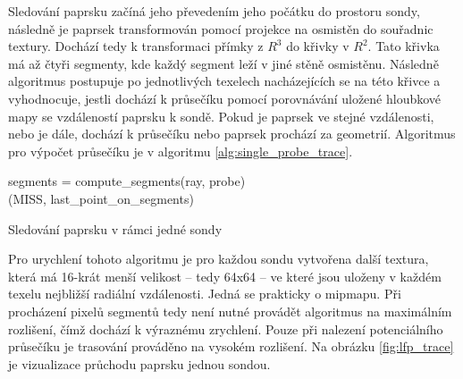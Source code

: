 Sledování paprsku začíná jeho převedením jeho počátku do prostoru sondy, následně je paprsek transformován pomocí projekce na osmistěn do souřadnic textury. Dochází tedy k transformaci přímky z $R^3$ do křivky v $R^2$. Tato křivka má až čtyři segmenty, kde každý segment leží v jiné stěně osmistěnu. Následně algoritmus postupuje po jednotlivých texelech nacházejících se na této křivce a vyhodnocuje, jestli dochází k průsečíku pomocí porovnávání uložené hloubkové mapy se vzdáleností paprsku k sondě. Pokud je paprsek ve stejné vzdálenosti, nebo je dále, dochází k průsečíku nebo paprsek prochází za geometrií. Algoritmus pro výpočet průsečíku je v algoritmu \ref{alg:single_probe_trace}. 

\begin{center}
	\begin{czechalgorithm}[H] \label{alg:single_probe_trace}
	    segments = compute\_segments(ray, probe)\\
	    \KwRet (MISS, last\_point\_on\_segments)
		\caption{Sledování paprsku v rámci jedné sondy}
	\end{czechalgorithm}
\end{center}

Pro urychlení tohoto algoritmu je pro každou sondu vytvořena další textura, která má 16-krát menší velikost -- tedy 64x64 -- ve které jsou uloženy v každém texelu nejbližší radiální vzdálenosti. Jedná se prakticky o mipmapu. Při procházení pixelů segmentů tedy není nutné provádět algoritmus na maximálním rozlišení, čímž dochází k výraznému zrychlení. Pouze při nalezení potenciálního průsečíku je trasování prováděno na vysokém rozlišení. Na obrázku \ref{fig:lfp_trace} je vizualizace průchodu paprsku jednou sondou.


